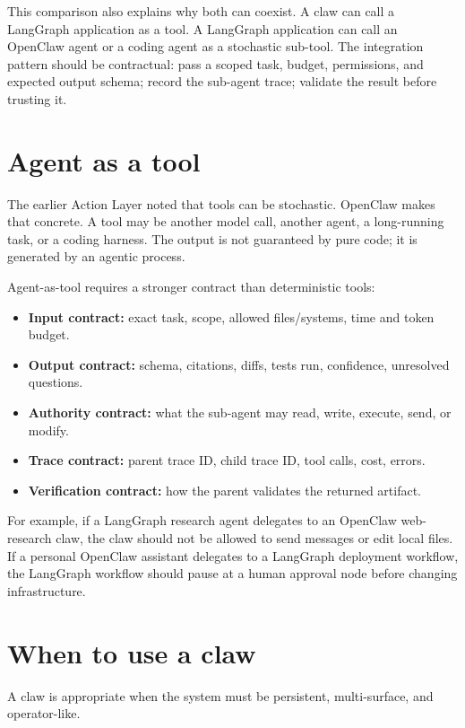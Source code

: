 This comparison also explains why both can coexist. A claw can call a LangGraph application as a tool. A LangGraph application can call an OpenClaw agent or a coding agent as a stochastic sub-tool. The integration pattern should be contractual: pass a scoped task, budget, permissions, and expected output schema; record the sub-agent trace; validate the result before trusting it.

\section{Agent as a tool}

The earlier Action Layer noted that tools can be stochastic. OpenClaw makes that concrete. A tool may be another model call, another agent, a long-running task, or a coding harness. The output is not guaranteed by pure code; it is generated by an agentic process.

Agent-as-tool requires a stronger contract than deterministic tools:

\begin{itemize}[leftmargin=*]
  \item \textbf{Input contract:} exact task, scope, allowed files/systems, time and token budget.
  \item \textbf{Output contract:} schema, citations, diffs, tests run, confidence, unresolved questions.
  \item \textbf{Authority contract:} what the sub-agent may read, write, execute, send, or modify.
  \item \textbf{Trace contract:} parent trace ID, child trace ID, tool calls, cost, errors.
  \item \textbf{Verification contract:} how the parent validates the returned artifact.
\end{itemize}

For example, if a LangGraph research agent delegates to an OpenClaw web-research claw, the claw should not be allowed to send messages or edit local files. If a personal OpenClaw assistant delegates to a LangGraph deployment workflow, the LangGraph workflow should pause at a human approval node before changing infrastructure.

\section{When to use a claw}

A claw is appropriate when the system must be persistent, multi-surface, and operator-like.

